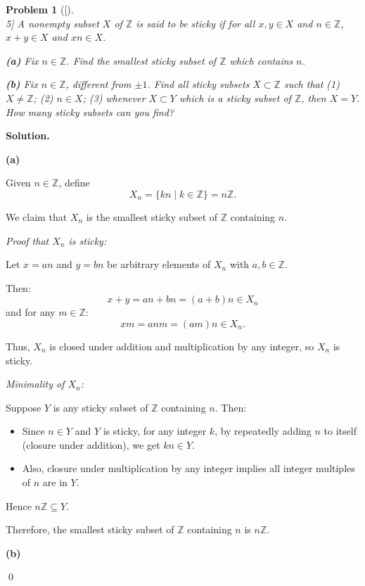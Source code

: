 \documentclass[12pt]{article}
\newtheorem{problemx}{Problem}
\newenvironment{problem}[1]{%
	\begin{problemx}[#1]\leavevmode\\[0.5em] %
	}{%
	\end{problemx}
}
\newenvironment{solution}{%
	\par\medskip
	\noindent\textbf{Solution.}\par\nopagebreak
}{%
	\hfill \qed \par\medskip
}
\begin{document}
\begin{problem}[5]
	A nonempty subset $X$ of $\mathbb{Z}$ is said to be \textit{sticky} if for all $x, y \in X$ and $n \in \mathbb{Z}$, $x + y \in X$ and $xn \in X$.
	
	\textbf{(a)} Fix $n \in \mathbb{Z}$. Find the smallest sticky subset of $\mathbb{Z}$ which contains $n$.
	
	\textbf{(b)} Fix $n \in \mathbb{Z}$, different from $\pm1$. Find all sticky subsets $X \subset \mathbb{Z}$ such that (1) $X \neq \mathbb{Z}$; (2) $n \in X$; (3) whenever $X \subset Y$ which is a sticky subset of $\mathbb{Z}$, then $X = Y$. How many sticky subsets can you find? 
\end{problem}

\begin{solution}
	
	\textbf{(a)}
	
	Given $n \in \mathbb{Z}$, define 
	\[
	X_n = \{ k n \mid k \in \mathbb{Z} \} = n \mathbb{Z}.
	\]
	
	We claim that $X_n$ is the smallest sticky subset of $\mathbb{Z}$ containing $n$.
	
	\textit{Proof that $X_n$ is sticky:}
	
	Let $x = a n$ and $y = b n$ be arbitrary elements of $X_n$ with $a, b \in \mathbb{Z}$.
	
	Then:
	\[
	x + y = a n + b n = (a + b) n \in X_n
	\]
	and for any $m \in \mathbb{Z}$:
	\[
	x m = a n m = (a m) n \in X_n.
	\]
	
	Thus, $X_n$ is closed under addition and multiplication by any integer, so $X_n$ is sticky.
	
	\textit{Minimality of $X_n$:}
	
	Suppose $Y$ is any sticky subset of $\mathbb{Z}$ containing $n$. Then:
	
	\begin{itemize}
		\item Since $n \in Y$ and $Y$ is sticky, for any integer $k$, by repeatedly adding $n$ to itself (closure under addition), we get $k n \in Y$.
		\item Also, closure under multiplication by any integer implies all integer multiples of $n$ are in $Y$.
	\end{itemize}
	
	Hence $n \mathbb{Z} \subseteq Y$.
	
	Therefore, the smallest sticky subset of $\mathbb{Z}$ containing $n$ is $n \mathbb{Z}$.
	
\textbf{(b)}


\end{solution}
\end{document}
